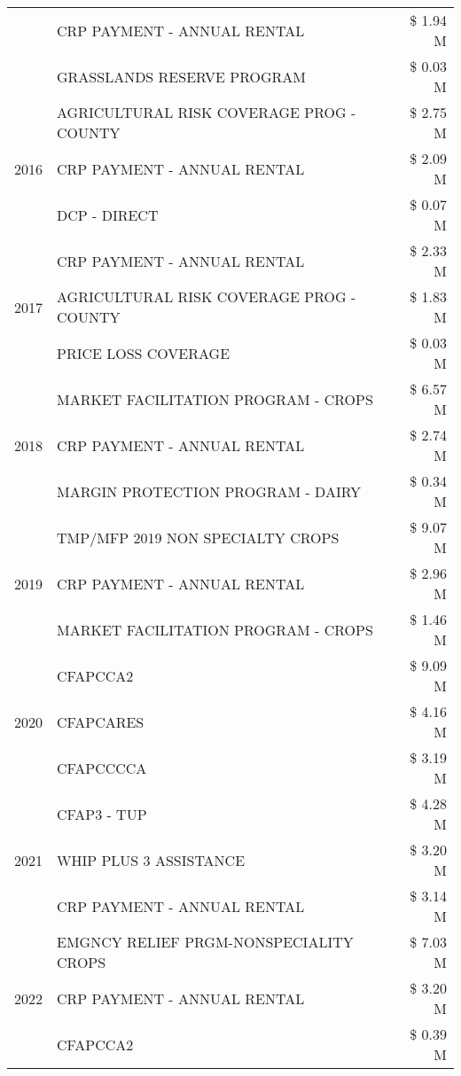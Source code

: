 \begin{tabular}{llr}
 & CRP PAYMENT - ANNUAL RENTAL & \$ 1.94 M \\
 & GRASSLANDS RESERVE PROGRAM & \$ 0.03 M \\
\cline{1-3}
\multirow[t]{3}{*}{2016} & AGRICULTURAL RISK COVERAGE PROG - COUNTY & \$ 2.75 M \\
 & CRP PAYMENT - ANNUAL RENTAL & \$ 2.09 M \\
 & DCP - DIRECT & \$ 0.07 M \\
\cline{1-3}
\multirow[t]{3}{*}{2017} & CRP PAYMENT - ANNUAL RENTAL & \$ 2.33 M \\
 & AGRICULTURAL RISK COVERAGE PROG - COUNTY & \$ 1.83 M \\
 & PRICE LOSS COVERAGE & \$ 0.03 M \\
\cline{1-3}
\multirow[t]{3}{*}{2018} & MARKET FACILITATION PROGRAM - CROPS & \$ 6.57 M \\
 & CRP PAYMENT - ANNUAL RENTAL & \$ 2.74 M \\
 & MARGIN PROTECTION PROGRAM - DAIRY & \$ 0.34 M \\
\cline{1-3}
\multirow[t]{3}{*}{2019} & TMP/MFP 2019 NON SPECIALTY CROPS & \$ 9.07 M \\
 & CRP PAYMENT - ANNUAL RENTAL & \$ 2.96 M \\
 & MARKET FACILITATION PROGRAM - CROPS & \$ 1.46 M \\
\cline{1-3}
\multirow[t]{3}{*}{2020} & CFAPCCA2 & \$ 9.09 M \\
 & CFAPCARES & \$ 4.16 M \\
 & CFAPCCCCA & \$ 3.19 M \\
\cline{1-3}
\multirow[t]{3}{*}{2021} & CFAP3 - TUP & \$ 4.28 M \\
 & WHIP PLUS 3 ASSISTANCE & \$ 3.20 M \\
 & CRP PAYMENT - ANNUAL RENTAL & \$ 3.14 M \\
\cline{1-3}
\multirow[t]{3}{*}{2022} & EMGNCY RELIEF PRGM-NONSPECIALITY CROPS & \$ 7.03 M \\
 & CRP PAYMENT - ANNUAL RENTAL & \$ 3.20 M \\
 & CFAPCCA2 & \$ 0.39 M \\
\cline{1-3}
\bottomrule
\end{tabular}

